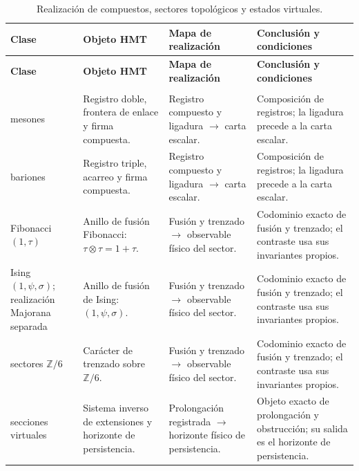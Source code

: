 \begingroup
\setlength{\tabcolsep}{4.5pt}
\renewcommand{\arraystretch}{1.28}
\begin{longtable}{@{}>{\raggedright\arraybackslash}p{}>{\raggedright\arraybackslash}p{}>{\raggedright\arraybackslash}p{}>{\raggedright\arraybackslash}p{}@{}}
\caption{Realización de compuestos, sectores topológicos y estados virtuales.}\label{tab:masas-realizacion-no-escalar}\\
\toprule
\textbf{Clase} & \textbf{Objeto HMT} & \textbf{Mapa de realización} & \textbf{Conclusión y condiciones} \\
\midrule
\endfirsthead
\toprule
\textbf{Clase} & \textbf{Objeto HMT} & \textbf{Mapa de realización} & \textbf{Conclusión y condiciones} \\
\midrule
\endhead
\midrule
\multicolumn{4}{r}{\footnotesize Continúa en la página siguiente.}\\
\endfoot
\bottomrule
\endlastfoot
mesones & Registro doble, frontera de enlace y firma compuesta. & Registro compuesto y ligadura $\to$ carta escalar. & Composición de registros; la ligadura precede a la carta escalar. \\
bariones & Registro triple, acarreo y firma compuesta. & Registro compuesto y ligadura $\to$ carta escalar. & Composición de registros; la ligadura precede a la carta escalar. \\
Fibonacci $(1,\tau)$ & Anillo de fusión Fibonacci: $\tau\otimes\tau=1+\tau$. & Fusión y trenzado $\to$ observable físico del sector. & Codominio exacto de fusión y trenzado; el contraste usa sus invariantes propios. \\
Ising $(1,\psi,\sigma)$; realización Majorana separada & Anillo de fusión de Ising: $(1,\psi,\sigma)$. & Fusión y trenzado $\to$ observable físico del sector. & Codominio exacto de fusión y trenzado; el contraste usa sus invariantes propios. \\
sectores $\mathbb Z/6$ & Carácter de trenzado sobre $\mathbb Z/6$. & Fusión y trenzado $\to$ observable físico del sector. & Codominio exacto de fusión y trenzado; el contraste usa sus invariantes propios. \\
secciones virtuales & Sistema inverso de extensiones y horizonte de persistencia. & Prolongación registrada $\to$ horizonte físico de persistencia. & Objeto exacto de prolongación y obstrucción; su salida es el horizonte de persistencia. \\
\end{longtable}
\endgroup
